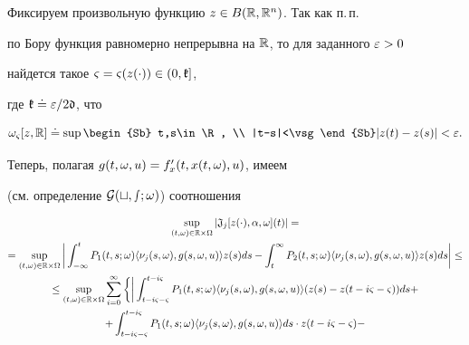 \begin{pf}


Фиксируем произвольную функцию $z\in B(\Bbb R,\Bbb R^{n})$. Так как п.\,п.


по Бору функция равномерно непрерывна на $\Bbb R$, то для заданного $\varepsilon>0$


найдется такое $\varsigma=\varsigma(z(\cdot))\in(0,\frak k]$,


где $\frak k\doteq\varepsilon/2\frak d$, что


\begin{equation}


\om_{\vsg}[z,\R]\doteq\sup\begin{Sb}


t,s\in\R, \\ |t-s|<\vsg \end{Sb} |z(t)-z(s)|<\ve.


\end{equation}


Теперь, полагая $g(t,\omega,u)=f'_{x}(t,x(t,\omega),u)$, имеем


(см. определение $\cal G(t,s;\omega)$) соотношения


\begin{gather*}


\sup\lt_{(t,\om)\in\R\times\Om}|\frak J_{j}[z(\cdot),\alpha,\om](t)|= \\


%


=\sup\lt_{(t,\om)\in\R\times\Om}\bigg|\int_{-\infty}^{t}P_{1}(t,s;\om)


\la\nu_{j}(s,\om),g(s,\om,u)\ra z(s)ds-


\int_{t}^{\infty}P_{2}(t,s;\om)\la\nu_{j}(s,\om),g(s,\om,u)\ra


z(s)ds\bigg|\le \\


%


\le\sup\lt_{(t,\om)\in\R\times\Om}\sum\lt_{i=0}^{\infty}


\bigg\{\bigg|\int_{t-i\vsg-\vsg}^{t-i\vsg}P_{1}(t,s;\om)\la


\nu_{j}(s,\om),g(s,\om,u)\ra (z(s)-z(t-i\vsg-\vsg))ds+\\


%


+\int_{t-i\vsg-\vsg}^{t-i\vsg}


P_{1}(t,s;\om)\la\nu_{j}(s,\om),


g(s,\om,u)\ra ds\cdot z(t-i\vsg-\vsg)- \\


%



\end{gather*}
\end{pf}
